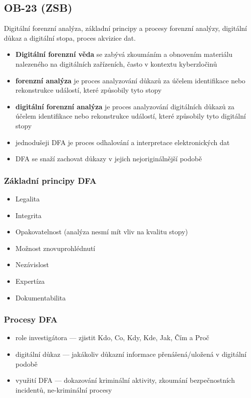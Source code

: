 \subsection{OB-23 (ZSB)}
Digitální forenzní analýza, základní principy a procesy forenzní analýzy, digitální důkaz a digitální stopa, proces akvizice dat.

\begin{itemize}
	\item \textbf{Digitální forenzní věda} se zabývá zkoumáním a obnovením materiálu nalezeného na di\-gi\-tál\-ních za\-ří\-ze\-ních, často v kontextu kyberzločinů
	\item \textbf{forenzní analýza} je proces analyzování důkazů za účelem identifikace nebo rekonstrukce událostí, které způsobily tyto stopy
	\item \textbf{digitální forenzní analýza} je proces analyzování digitálních  důkazů za účelem identifikace nebo rekonstrukce událostí, které způsobily tyto digitální stopy
	\item jednodušeji DFA je proces odhalování a interpretace elektronických dat
	\item DFA se snaží zachovat důkazy v jejich nejoriginálnější podobě
\end{itemize}

\subsubsection*{Základní principy DFA}
\begin{itemize}
	\item Legalita 
	\item Integrita 
	\item Opakovatelnost (analýza nesmí mít vliv na kvalitu stopy)
	\item Možnost znovuprohlédnutí
	\item Nezávislost
	\item Expertíza
	\item Dokumentabilita
\end{itemize}

\subsubsection*{Procesy DFA}
\begin{itemize}
	\item role investigátora --- zjistit Kdo, Co, Kdy, Kde, Jak, Čím a Proč
	\item digitální důkaz --- jakákoliv důkazní informace přenášená/uložená v digitální podobě
	\item využití DFA --- dokazování kriminální aktivity, zkoumání bezpečnostních incidentů, ne-kriminální procesy
\end{itemize}

